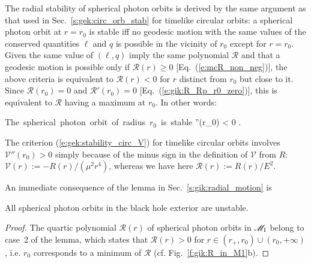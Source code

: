 The radial stability of spherical photon orbits is derived by the same
argument as that used in Sec.~\ref{s:gek:circ_orb_stab} for timelike circular
orbits: a spherical photon orbit at $r=r_0$ is
stable iff no geodesic motion with the same values of the
conserved quantities $\ell$ and $q$
is possible in the vicinity of $r_0$ except for $r=r_0$. Given
the same value of $(\ell,q)$ imply the same polynomial $\mathcal{R}$ and
that a geodesic
motion is possible only if $\mathcal{R}(r) \geq 0$ [Eq.~(\ref{e:mcR_non_neg})],
the above criteria is equivalent to $\mathcal{R}(r) < 0$
for $r$ distinct from $r_0$ but close to it. Since $\mathcal{R}(r_0) = 0$
and $\mathcal{R}'(r_0) = 0$ [Eq.~(\ref{e:gik:R_Rp_r0_zero})], this is equivalent
to $\mathcal{R}$ having a maximum at $r_0$. In other words:
\begin{greybox}
\be \label{e:gik:stability_spher}
    \mbox{The spherical photon orbit of radius $r_0$ is stable} \iff
    ''(r_0) < 0 .
\ee
\end{greybox}
\begin{remark}
The criterion (\ref{e:gek:stability_circ_V}) for timelike circular orbits involves
$\mathcal{V}''(r_0) > 0$ simply because
of the minus sign in the definition of $\mathcal{V}$ from $R$:
$\mathcal{V}(r) := - R(r) / (\mu^2 r^4)$, whereas we have here
$\mathcal{R}(r) := R(r)/E^2$.
\end{remark}

An immediate consequence of the lemma in Sec.~\ref{s:gik:radial_motion} is
\begin{greybox}
All spherical photon orbits in the black hole exterior are unstable.
\end{greybox}
\begin{proof}
The quartic polynomial $\mathcal{R}(r)$ of spherical photon orbits in $\mathscr{M}_{\rm I}$
belong to case~2 of the lemma, which states that $\mathcal{R}(r)>0$ for $r\in (r_+, r_0)\cup(r_0, +\infty)$,
i.e. $r_0$ corresponds to a minimum of $\mathcal{R}$ (cf. Fig.~\ref{f:gik:R_in_M1}b).
\end{proof}

